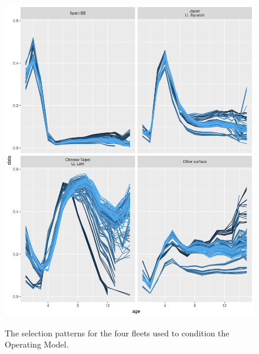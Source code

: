\documentclass[%
nonumbib,      %
%
]{nrc1}                          %
\begin{document}
\begin{figure}[htbp]
\centering
\includegraphics[width=6in]{oem-sel.png}
\label{fig:oem-sel}
\caption{The selection patterns for the four fleets used to condition the Operating Model.}
\end{figure}
\end{document}
